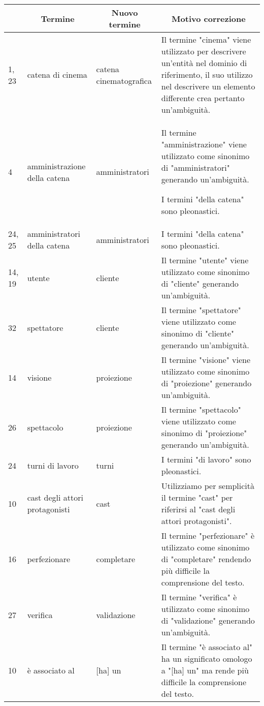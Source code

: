 \begin{tabularx}{\linewidth}{|p{1.5cm}|p{3cm}|p{3cm}|X|}
    \hline
    \rowcolor{tblhdrcolor}
    \multicolumn{1}{|c|}{\textbf{Linea}}
     & \multicolumn{1}{|c|}{\textbf{Termine}}
     & \multicolumn{1}{|c|}{\textbf{Nuovo termine}}
     & \multicolumn{1}{|c|}{\textbf{Motivo correzione}}
    \\\hline
    1, 23
     & catena di cinema
     & catena cinematografica
     & Il termine "cinema" viene utilizzato per descrivere un’entità nel
    dominio di riferimento, il suo utilizzo nel descrivere un elemento
    differente crea pertanto un’ambiguità.
    \\ \hline
    4
     & amministrazione della catena
     & amministratori
     & Il termine "amministrazione" viene utilizzato come sinonimo di
    "amministratori" generando un'ambiguità.

    I termini "della catena" sono pleonastici.
    \\ \hline
    24, 25
     & amministratori della catena
     & amministratori
     & I termini "della catena" sono pleonastici.
    \\ \hline
    14, 19
     & utente
     & cliente
     & Il termine "utente" viene utilizzato come sinonimo di
    "cliente" generando un'ambiguità.
    \\ \hline
    32
     & spettatore
     & cliente
     & Il termine "spettatore" viene utilizzato come sinonimo di
    "cliente" generando un'ambiguità.
    \\ \hline
    14
     & visione
     & proiezione
     & Il termine "visione" viene utilizzato come sinonimo di
    "proiezione" generando un'ambiguità.
    \\ \hline
    26
     & spettacolo
     & proiezione
     & Il termine "spettacolo" viene utilizzato come sinonimo di
    "proiezione" generando un'ambiguità.
    \\ \hline
    24
     & turni di lavoro
     & turni
     & I termini "di lavoro" sono pleonastici.
    \\ \hline
    10
     & cast degli attori protagonisti
     & cast
     & Utilizziamo per semplicità il termine "cast" per riferirsi al
    "cast degli attori protagonisti".
    \\ \hline
    16
     & perfezionare
     & completare
     & Il termine "perfezionare" è utilizzato come sinonimo di "completare"
    rendendo più difficile la comprensione del testo.
    \\ \hline
    27
     & verifica
     & validazione
     & Il termine "verifica" è utilizzato come sinonimo di "validazione"
    generando un'ambiguità.
    \\ \hline
    10
     & è associato al
     & [ha] un
     & Il termine "è associato al" ha un significato omologo a
    "[ha] un" ma rende più difficile la comprensione del testo.
    \\ \hline
\end{tabularx}

